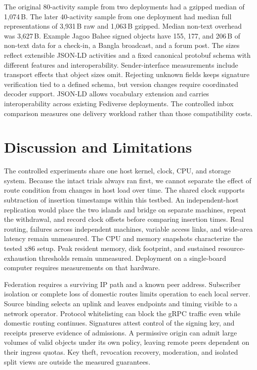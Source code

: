 \documentclass[conference,a4paper,10pt]{IEEEtran}
\begin{document}
The original 80-activity sample from two deployments had a gzipped median of 1,074\,B. The later 40-activity sample from one deployment had median full representations of 3,931\,B raw and 1,063\,B gzipped. Median non-text overhead was 3,627\,B. Example Jagoo Bahee signed objects have 155, 177, and 206\,B of non-text data for a check-in, a Bangla broadcast, and a forum post. The sizes reflect extensible JSON-LD activities and a fixed canonical protobuf schema with different features and interoperability. Sender-interface measurements include transport effects that object sizes omit. Rejecting unknown fields keeps signature verification tied to a defined schema, but version changes require coordinated decoder support. JSON-LD allows vocabulary extension and carries interoperability across existing Fediverse deployments. The controlled inbox comparison measures one delivery workload rather than those compatibility costs.

\section{Discussion and Limitations}

The controlled experiments share one host kernel, clock, CPU, and storage system. Because the intact trials always ran first, we cannot separate the effect of route condition from changes in host load over time. The shared clock supports subtraction of insertion timestamps within this testbed. An independent-host replication would place the two islands and bridge on separate machines, repeat the withdrawal, and record clock offsets before comparing insertion times. Real routing, failures across independent machines, variable access links, and wide-area latency remain unmeasured. The CPU and memory snapshots characterize the tested x86 setup. Peak resident memory, disk footprint, and sustained resource-exhaustion thresholds remain unmeasured. Deployment on a single-board computer requires measurements on that hardware.

Federation requires a surviving IP path and a known peer address. Subscriber isolation or complete loss of domestic routes limits operation to each local server. Source binding selects an uplink and leaves endpoints and timing visible to a network operator. Protocol whitelisting can block the gRPC traffic even while domestic routing continues. Signatures attest control of the signing key, and receipts preserve evidence of admissions. A permissive origin can admit large volumes of valid objects under its own policy, leaving remote peers dependent on their ingress quotas. Key theft, revocation recovery, moderation, and isolated split views are outside the measured guarantees.
\end{document}
